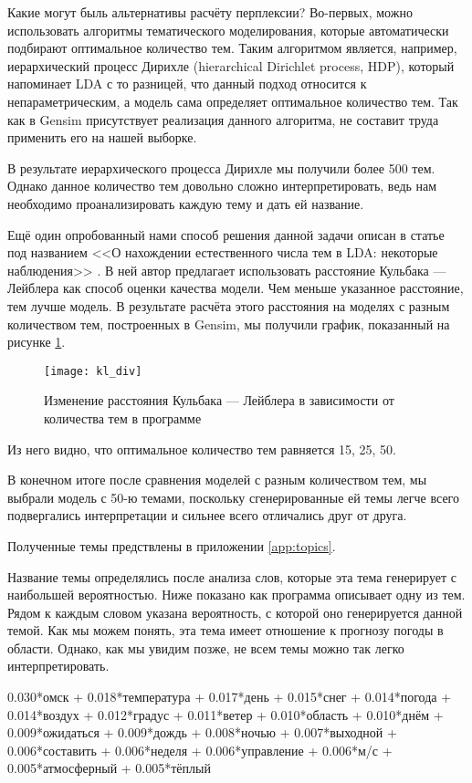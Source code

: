 Какие могут быль альтернативы расчёту перплексии? Во-первых, можно использовать алгоритмы тематического моделирования, которые автоматически подбирают оптимальное количество тем. Таким алгоритмом является, например, иерархический процесс Дирихле (hierarchical Dirichlet process, HDP), который напоминает LDA с то разницей, что данный подход относится к непараметрическим, а модель сама определяет оптимальное количество тем. Так как в Gensim присутствует реализация данного алгоритма, не составит труда применить его на нашей выборке.

В результате иерархического процесса Дирихле мы получили более 500 тем. Однако данное количество тем довольно сложно  интерпретировать, ведь нам необходимо проанализировать каждую тему и дать ей название.

Ещё один опробованный нами способ решения данной задачи описан в статье под названием <<О нахождении естественного числа тем в LDA: некоторые наблюдения>> \cite{Arun_KL}. В ней автор предлагает использовать  расстояние Кульбака — Лейблера как способ оценки качества модели. Чем меньше указанное расстояние, тем лучше модель. В результате расчёта этого расстояния на моделях с разным количеством тем, построенных в Gensim, мы получили график, показанный на рисунке \ref{fig:kl_div}.

\begin{figure}
	\centering
    \texttt{[image: kl\_div]}
    \caption{Изменение расстояния Кульбака — Лейблера в зависимости от количества тем в программе}
    \label{fig:kl_div}
\end{figure}

Из него видно, что оптимальное количество тем равняется 15, 25, 50.

В конечном итоге после сравнения моделей с разным количеством тем, мы выбрали модель с 50-ю темами, поскольку сгенерированные ей темы легче всего подвергались интерпретации и сильнее всего отличались друг от друга.

Полученные темы предствлены в приложении \ref{app:topics}.

Название темы определялись после анализа слов, которые эта тема генерирует с наибольшей вероятностью. Ниже показано как программа описывает одну из тем. Рядом к каждым словом указана вероятность, с которой оно генерируется данной темой. Как мы можем понять, эта тема имеет отношение к прогнозу погоды в области. Однако, как мы увидим позже, не всем темы можно так легко интерпретировать.

0.030*омск + 0.018*температура + 0.017*день + 0.015*снег + 0.014*погода + 0.014*воздух + 0.012*градус + 0.011*ветер + 0.010*область + 0.010*днём + 0.009*ожидаться + 0.009*дождь + 0.008*ночью + 0.007*выходной + 0.006*составить + 0.006*неделя + 0.006*управление + 0.006*м/с + 0.005*атмосферный + 0.005*тёплый

